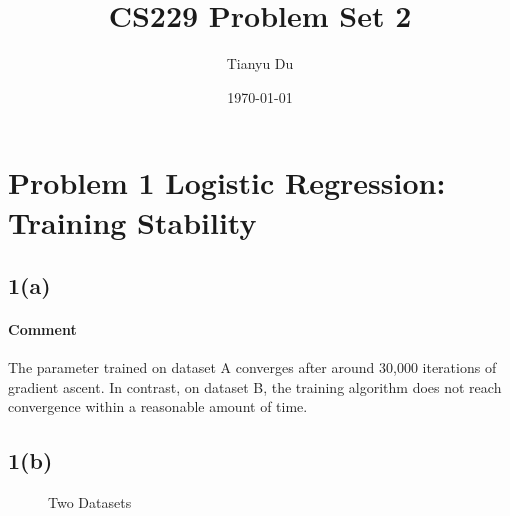 \documentclass[11pt]{article}
\title{CS229 Problem Set 2}
\date{\today}
\author{Tianyu Du}
\begin{document}
	\maketitle
	\newpage
	\section{Problem 1 Logistic Regression: Training Stability}
	\subsection{1(a)}
	\paragraph{Comment} The parameter trained on dataset A converges after around 30,000 iterations of gradient ascent. In contrast, on dataset B, the training algorithm does not reach convergence within a reasonable amount of time.
	\newpage
	\subsection{1(b)}
	\begin{figure}[h]
	    \centering
	    \caption{Two Datasets}
	\end{figure}
\end{document}
